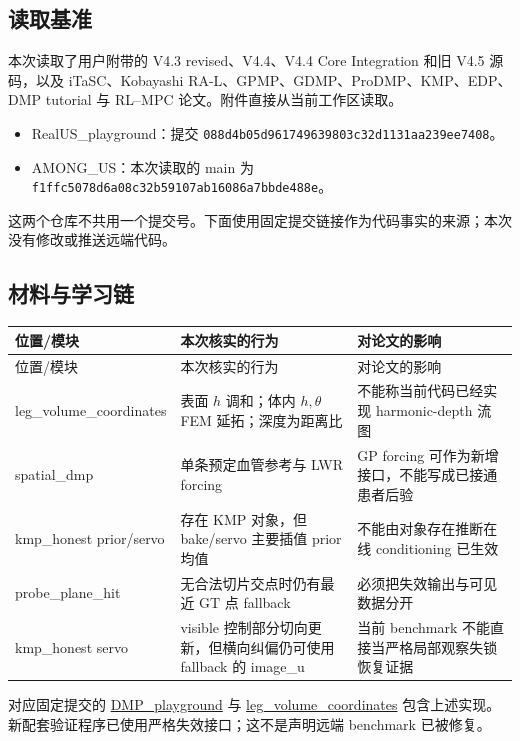 \documentclass[11pt,a4paper]{article}
\theoremstyle{cn}
\begin{document}
\subsection{读取基准}

本次读取了用户附带的 V4.3 revised、V4.4、V4.4 Core Integration 和旧 V4.5 源码，以及 iTaSC、Kobayashi RA-L、GPMP、GDMP、ProDMP、KMP、EDP、DMP tutorial 与 RL--MPC 论文。附件直接从当前工作区读取。

\begin{itemize}
\item RealUS\_playground：提交
\texttt{088d4b05d961749639803c32d1131aa239ee7408}。
\item AMONG\_US：本次读取的 main 为
\texttt{f1ffc5078d6a08c32b59107ab16086a7bbde488e}。
\end{itemize}

这两个仓库不共用一个提交号。下面使用固定提交链接作为代码事实的来源；本次没有修改或推送远端代码。

\subsection{材料与学习链}

\small
\begin{longtable}{@{}p{.22\linewidth}p{.34\linewidth}p{.36\linewidth}@{}}
\toprule
位置/模块 & 本次核实的行为 & 对论文的影响\\
\midrule
\endfirsthead
\toprule 位置/模块 & 本次核实的行为 & 对论文的影响\\\midrule
\endhead
leg\_volume\_\allowbreak coordinates & 表面 \(h\) 调和；体内 \(h,\theta\) FEM 延拓；深度为距离比 & 不能称当前代码已经实现 harmonic-depth 流图\\
spatial\_dmp & 单条预定血管参考与 LWR forcing & GP forcing 可作为新增接口，不能写成已接通患者后验\\
kmp\_honest prior/servo & 存在 KMP 对象，但 bake/servo 主要插值 prior 均值 & 不能由对象存在推断在线 conditioning 已生效\\
probe\_plane\_hit & 无合法切片交点时仍有最近 GT 点 fallback & 必须把失效输出与可见数据分开\\
kmp\_honest servo & visible 控制部分切向更新，但横向纠偏仍可使用 fallback 的 image\_u & 当前 benchmark 不能直接当严格局部观察失锁恢复证据\\
\bottomrule
\end{longtable}
\normalsize

对应固定提交的
\href{https://github.com/NingMeng0903/AMONG_US/tree/f1ffc5078d6a08c32b59107ab16086a7bbde488e/DMP_playground}{DMP\_playground}
与
\href{https://github.com/NingMeng0903/AMONG_US/tree/f1ffc5078d6a08c32b59107ab16086a7bbde488e/src/projects/genesis_ue_sync/anatomy_retarget/leg_volume_coordinates}{leg\_volume\_coordinates}
包含上述实现。新配套验证程序已使用严格失效接口；这不是声明远端 benchmark 已被修复。
\end{document}

